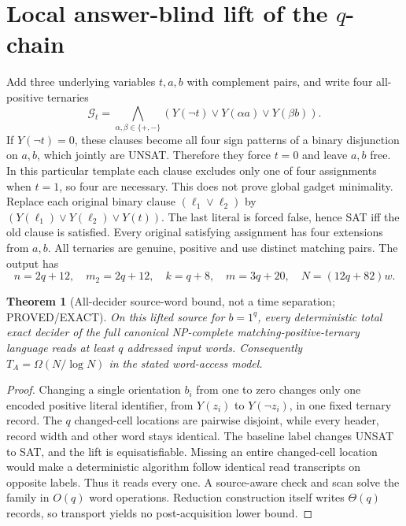 \documentclass[11pt]{article}
\newtheorem{theorem}{Theorem}\newtheorem{lemma}{Lemma}
\begin{document}
\section{Local answer-blind lift of the $q$-chain}
Add three underlying variables $t,a,b$ with complement pairs, and write four all-positive ternaries
\[
\mathcal G_t=\bigwedge_{\alpha,\beta\in\{+,-\}}(Y(\neg t)\vee Y(\alpha a)\vee Y(\beta b)).
\]
If $Y(\neg t)=0$, these clauses become all four sign patterns of a binary disjunction on $a,b$, which jointly are UNSAT. Therefore they force $t=0$ and leave $a,b$ free. In this particular template each clause excludes only one of four assignments when $t=1$, so four are necessary. This does not prove global gadget minimality.
Replace each original binary clause $(\ell_1\vee\ell_2)$ by $(Y(\ell_1)\vee Y(\ell_2)\vee Y(t))$. The last literal is forced false, hence SAT iff the old clause is satisfied. Every original satisfying assignment has four extensions from $a,b$. All ternaries are genuine, positive and use distinct matching pairs. The output has
\[
\boxed{n=2q+12,\quad m_2=2q+12,\quad k=q+8,\quad m=3q+20,\quad N=(12q+82)w.}
\]
\begin{theorem}[All-decider source-word bound, not a time separation; PROVED/EXACT]
On this lifted source for $b=1^q$, every deterministic total exact decider of the full canonical NP-complete matching-positive-ternary language reads at least $q$ addressed input words. Consequently $T_A=\Omega(N/\log N)$ in the stated word-access model.
\end{theorem}
\begin{proof}
Changing a single orientation $b_i$ from one to zero changes only one encoded positive literal identifier, from $Y(z_i)$ to $Y(\neg z_i)$, in one fixed ternary record. The $q$ changed-cell locations are pairwise disjoint, while every header, record width and other word stays identical. The baseline label changes UNSAT to SAT, and the lift is equisatisfiable. Missing an entire changed-cell location would make a deterministic algorithm follow identical read transcripts on opposite labels. Thus it reads every one. A source-aware check and scan solve the family in $O(q)$ word operations. Reduction construction itself writes $\Theta(q)$ records, so transport yields no post-acquisition lower bound.
\end{proof}
\end{document}
